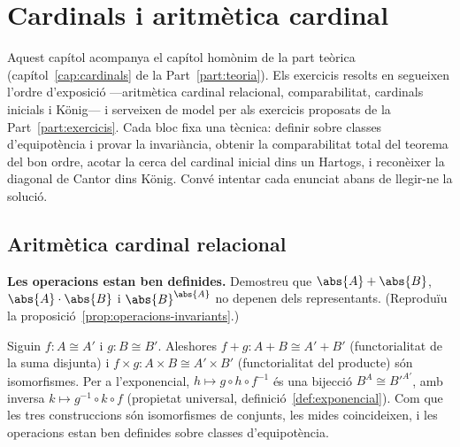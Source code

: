 \chapter{Cardinals i aritmètica cardinal}\label{cap:practica-cardinals}

Aquest capítol acompanya el capítol homònim de la part teòrica (capítol~\ref{cap:cardinals} de la Part~\ref{part:teoria}). Els exercicis resolts en segueixen l'ordre d'exposició ---aritmètica cardinal relacional, comparabilitat, cardinals inicials i König--- i serveixen de model per als exercicis proposats de la Part~\ref{part:exercicis}. Cada bloc fixa una tècnica: definir sobre classes d'equipotència i provar la invariància, obtenir la comparabilitat total del teorema del bon ordre, acotar la cerca del cardinal inicial dins un Hartogs, i reconèixer la diagonal de Cantor dins König. Convé intentar cada enunciat abans de llegir-ne la solució.

\section{Aritmètica cardinal relacional}\label{prac:aritmetica-cardinal}

\begin{exercici}
\textbf{Les operacions estan ben definides.} Demostreu que \(\abs{A}+\abs{B}\), \(\abs{A}\cdot\abs{B}\) i \(\abs{B}^{\abs{A}}\) no depenen dels representants. (Reproduïu la proposició~\ref{prop:operacions-invariants}.)
\end{exercici}
\begin{solucio}
Siguin \(f\colon A\cong A'\) i \(g\colon B\cong B'\). Aleshores \(f+g\colon A+B\cong A'+B'\) (functorialitat de la suma disjunta) i \(f\times g\colon A\times B\cong A'\times B'\) (functorialitat del producte) són isomorfismes. Per a l'exponencial, \(h\mapsto g\circ h\circ f^{-1}\) és una bijecció \(B^A\cong B'^{A'}\), amb inversa \(k\mapsto g^{-1}\circ k\circ f\) (propietat universal, definició~\ref{def:exponencial}). Com que les tres construccions són isomorfismes de conjunts, les mides coincideixen, i les operacions estan ben definides sobre classes d'equipotència.
\end{solucio}

